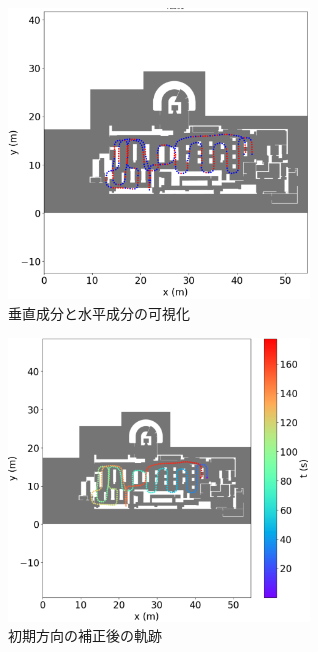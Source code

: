 \documentclass[Japanese]{dicomopapers}
\begin{document}
\begin{figure}[h]
	\centering
	\includegraphics[width=80mm]{image/rb.png}
	\caption{垂直成分と水平成分の可視化}    \label{fig:color}
\end{figure}

\begin{figure}[h]
	\centering
	\includegraphics[width=80mm]{image/pdr-rotate.jpg}
	\caption{初期方向の補正後の軌跡}    \label{}
\end{figure}









\end{document}
